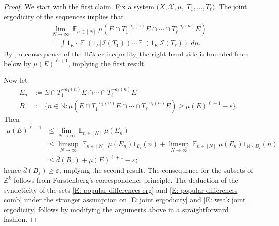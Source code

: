 \documentclass[11pt]{amsart}
\theoremstyle{definition}
\DeclareMathOperator*{\E}{\mathbb{E}}
\newcommand{\N}{{\mathbb N}}
\newcommand{\Z}{{\mathbb Z}}
\newcommand{\CI}{{\mathcal I}}
\newcommand{\CX}{{\mathcal X}}
\newcommand{\veps}{\varepsilon}
\newcommand{\1}{{\mathbf{1}}}
\begin{document}
\begin{proof}
We start with the first claim. Fix a system $(X, \CX, \mu,$\! $T_1, \ldots, T_\ell)$. The joint ergodicity of the sequences implies that
\begin{multline*}
\lim_{N\to\infty}\E_{n\in[N]}\mu(E\cap T_1^{-{a_1(n)}}E\cap \cdots \cap T_\ell^{-{a_\ell(n)}}E)\\
= \int 1_E \cdot \E(1_E|\CI(T_1)) \cdots \E(1_E|\CI(T_\ell))\; d\mu.
\end{multline*}
By \cite[Lemma 1.6]{Chu11}, a consequence of the H\"older inequality, the right hand side is bounded from below by $\mu(E)^{\ell+1}$, implying the first result. 

Now let 
\begin{align*}
    E_n &:= E\cap T_1^{-{a_1(n)}}E\cap \cdots \cap T_\ell^{-{a_\ell(n)}}E\\
    B_\veps &:= 	\{n\in\N\colon \mu(E\cap T_1^{-{a_1(n)}}E\cap \cdots \cap T_\ell^{-{a_\ell(n)}}E) \geq \mu(E)^{\ell+1} - \veps\}.
\end{align*}
Then 
\begin{align*}
    \mu(E)^{\ell+1}&\leq \lim_{N\to\infty}\E_{n\in[N]}\mu(E_n)\\
    &\leq \limsup_{N\to\infty}\E_{n\in[N]}\mu(E_n)1_{B_\veps}(n) + \limsup_{N\to\infty}\E_{n\in[N]}\mu(E_n) 1_{\N\backslash B_\veps}(n)\\
    &\leq \overline{d}(B_\veps) + \mu(E)^{\ell+1} - \veps;
\end{align*}
hence $\overline{d}(B_\veps) \geq \veps$, implying the second result. The consequence for the subsets of $\Z^k$ follows from Furstenberg's correspondence principle. The deduction of the syndeticity of the sets \eqref{E: popular differences erg} and \eqref{E: popular differences comb} under the stronger assumption on \eqref{E: joint ergodicity} and \eqref{E: weak joint ergodicity} follows by modifying the arguments above in a straightforward fashion.
\end{proof}
\end{document}
